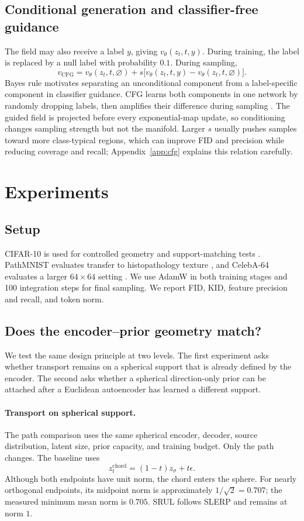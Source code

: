 \documentclass{article}
\begin{document}
\subsection{Conditional generation and classifier-free guidance}
The field may also receive a label $y$, giving $v_\theta(z_t,t,y)$. During training, the label is replaced by a null label with probability $0.1$. During sampling,
\begin{equation}
 v_{\mathrm{CFG}}=v_\theta(z_t,t,\varnothing)
+s\big[v_\theta(z_t,t,y)-v_\theta(z_t,t,\varnothing)\big].
\label{eq:cfg}
\end{equation}
Bayes rule motivates separating an unconditional component from a label-specific component in classifier guidance. CFG learns both components in one network by randomly dropping labels, then amplifies their difference during sampling \cite{cfg}. The guided field is projected before every exponential-map update, so conditioning changes sampling strength but not the manifold. Larger $s$ usually pushes samples toward more class-typical regions, which can improve FID and precision while reducing coverage and recall; Appendix~\ref{app:cfg} explains this relation carefully.

\section{Experiments}
\subsection*{Setup}
CIFAR-10 is used for controlled geometry and support-matching tests \cite{cifar}. PathMNIST evaluates transfer to histopathology texture \cite{medmnist}, and CelebA-64 evaluates a larger $64\times64$ setting \cite{celeba}. We use AdamW in both training stages and 100 integration steps for final sampling. We report FID, KID, feature precision and recall, and token norm.

\subsection*{Does the encoder--prior geometry match?}
We test the same design principle at two levels. The first experiment asks whether transport remains on a spherical support that is already defined by the encoder. The second asks whether a spherical direction-only prior can be attached after a Euclidean autoencoder has learned a different support.

\paragraph{Transport on spherical support.}
The path comparison uses the same spherical encoder, decoder, source distribution, latent size, prior capacity, and training budget. Only the path changes. The baseline uses
\begin{equation}
 z_t^{\mathrm{chord}}=(1-t)z_\sigma+t\epsilon.
\end{equation}
Although both endpoints have unit norm, the chord enters the sphere. For nearly orthogonal endpoints, its midpoint norm is approximately $1/\sqrt2=0.707$; the measured minimum mean norm is $0.705$. SRUL follows SLERP and remains at norm $1$.
\end{document}
